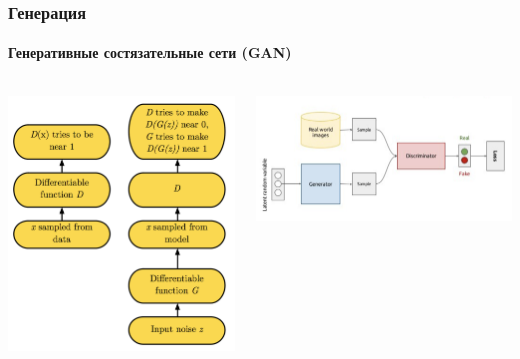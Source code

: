 \documentclass[10pt]{beamer}
\begin{document}
\begin{frame}
\frametitle{Генерация}
\framesubtitle{Генеративные состязательные сети (GAN)}


\begin{columns}
    \begin{column}{0.35\textwidth}
        \begin{center}
            \includegraphics[width=\textwidth]{images/gan_fw.png}
        \end{center}
    \end{column}
    \begin{column}{0.65\textwidth}
        \vskip-4mm
        \begin{center}
            \vskip-7mm
            \includegraphics[width=\textwidth]{images/fan_ov.png}\\

\end{center}
\end{column}
\end{columns}
\end{frame}
\end{document}
